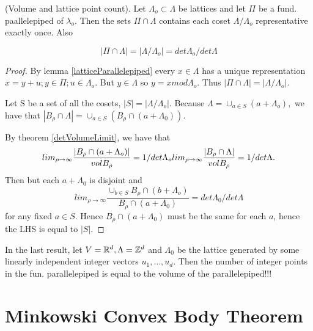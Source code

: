 \begin{theorem}(Volume and lattice point count). Let $\Lambda_o \subset \Lambda$ be lattices and let $\Pi$ be a fund. paallelepiped of $\lambda_o$. Then the sets $\Pi \cap \Lambda$ contains each coset $\Lambda / \Lambda_o$ representative exactly once. Also
	
\begin{displaymath}
	 | \Pi \cap \Lambda | = | \Lambda / \Lambda_o | = det \Lambda_o / det \Lambda
\end{displaymath}
\end{theorem}

\begin{proof}
	By lemma \ref{latticeParallelepiped} every $x \in \Lambda$ has a unique representation $x = y + u; y \in \Pi; u \in \Lambda_o$. But $y \in \Lambda$ so $y = x mod \Lambda_o$. Thus $ | \Pi \cap \Lambda | = | \Lambda / \Lambda_o | $.

Let S be a set of all the cosets, $|S| =| \Lambda / \Lambda_o | $. Because $\Lambda = \cup_{a \in S} (a + \Lambda_o),$ we have that $|B_\rho \cap \Lambda| = \cup _{a \in S} ( B_\rho \cap (a + \Lambda_0)).$

By theorem \ref{detVolumeLimit}, we have that 
\begin{displaymath}
	 lim_{\rho \to \infty} \frac{|B_\rho \cap (a+\Lambda_o) |}{vol B_\rho} = 1/det \Lambda_o \\
 	 lim_{\rho \to \infty} \frac{|B_\rho \cap \Lambda|}{vol B_\rho} = 1/det \Lambda.
\end{displaymath}
Then but each $a + \Lambda_0$ is disjoint and 
\begin{displaymath}
	 lim_{\rho \to \infty} \frac{\cup_{b \in S} B_\rho \cap  (b+\Lambda_o)}{B_\rho \cap (a + \Lambda_0)} = det \Lambda_0 /det \Lambda
\end{displaymath}
for any fixed $a \in S$. Hence $B_\rho \cap (a + \Lambda_0)$ must be the same for each $a$, hence the LHS is equal to $|S|$.
\end{proof}

\begin{remark}
	In the last result, let $V=\mathbb R^d, \Lambda=\mathbb Z^d$ and $\Lambda_0$ be the lattice generated by some linearly independent integer vectors $u_1, \dots, u_d$. Then the number of integer points in the fun. parallelepiped is equal to the volume of the parallelepiped!!!
\end{remark}


\section{Minkowski Convex Body Theorem}


